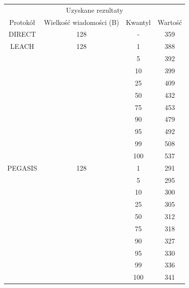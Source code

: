 \documentclass[a4paper,12pt,twoside,openany]{report}
\begin{document}
\begin{longtable}{*{4}{c}}
\toprule
\multicolumn{4}{c}{Uzyskane rezultaty} \\
Protokół	& Wielkość wiadomości (B)	& Kwantyl	& Wartość \\
\midrule
\endhead
DIRECT	& 128 	& -	& 359 \\*
\midrule
LEACH	& 128	& 1	& 388 \\*
	&	& 5	& 392 \\*
	&	& 10	& 399 \\*
	&	& 25	& 409 \\*
	&	& 50	& 432 \\*
	&	& 75	& 453 \\*
	&	& 90	& 479 \\*
	&	& 95	& 492 \\*
	&	& 99	& 508 \\*
	&	& 100	& 537 \\*
\midrule
PEGASIS	& 128	& 1	& 291 \\*
	&	& 5	& 295 \\*
	&	& 10	& 300 \\*
	&	& 25	& 305 \\*
	&	& 50	& 312 \\*
	&	& 75	& 318 \\*
	&	& 90	& 327 \\*
	&	& 95	& 330 \\*
	&	& 99	& 336 \\*
	&	& 100	& 341 \\*
\bottomrule
\end{longtable}
\end{document}
